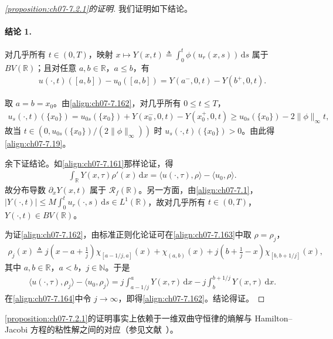 \documentclass[../../main.tex]{subfiles}%
\begin{document}
\begin{proof}[\cref{proposition:ch07-7.2.1}的证明]
我们证明如下结论。

\paragraph{结论 1.}对几乎所有 $t\in(0,T)$，映射 $x\mapsto Y(x,t)\triangleq \int_0^t\phi(u_r(x,s))\,\mathrm{d}s$ 属于 $BV(\mathbb{R})$；且对任意 $a,b\in\mathbb{R}$，$a\leqslant b$，有
\begin{align}
u(\cdot,t)([a,b])-u_0([a,b])=Y(a^-,0,t)-Y(b^+,0,t). \label{align:ch07-7.162}
\end{align}

取 $a=b=x_0$。由\eqref{align:ch07-7.162}，对几乎所有 $0\leqslant t\leqslant T$，
\begin{align*}
u_s(\cdot,t)(\{x_0\})=u_{0s}(\{x_0\})+Y(x_0^-,0,t)-Y(x_0^+,0,t)
\geqslant u_{0s}(\{x_0\})-2\|\phi\|_\infty t,
\end{align*}
故当 $t\in(0,u_{0s}(\{x_0\})/(2\|\phi\|_\infty))$ 时 $u_s(\cdot,t)(\{x_0\})>0$。由此得\eqref{align:ch07-7.19}。

余下证结论。如\eqref{align:ch07-7.161}那样论证，得
\begin{align}
\int_\mathbb{R}Y(x,\tau)\rho'(x)\,\mathrm{d}x=\langle u(\cdot,\tau),\rho\rangle-\langle u_0,\rho\rangle. \label{align:ch07-7.163}
\end{align}
故分布导数 $\partial_xY(x,t)$ 属于 $\mathscr{R}_f(\mathbb{R})$。另一方面，由\eqref{align:ch07-7.1}，$|Y(\cdot,t)|\leqslant M\int_0^t u_r(\cdot,s)\,\mathrm{d}s\in L^1(\mathbb{R})$，故对几乎所有 $t\in(0,T)$，$Y(\cdot,t)\in BV(\mathbb{R})$。

为证\eqref{align:ch07-7.162}，由标准正则化论证可在\eqref{align:ch07-7.163}中取 $\rho=\rho_j$，
\begin{align*}
\rho_j(x)\triangleq j\left(x-a+\frac1j\right)\chi_{[a-1/j,a]}(x)+\chi_{(a,b)}(x)+j\left(b+\frac1j-x\right)\chi_{[b,b+1/j]}(x),
\end{align*}
其中 $a,b\in\mathbb{R}$，$a<b$，$j\in\mathbb{N}$。于是
\begin{align}
\langle u(\cdot,\tau),\rho_j\rangle-\langle u_0,\rho_j\rangle
=j\int_{a-1/j}^a Y(x,\tau)\,\mathrm{d}x-j\int_b^{b+1/j}Y(x,\tau)\,\mathrm{d}x. \label{align:ch07-7.164}
\end{align}
在\eqref{align:ch07-7.164}中令 $j\to\infty$，即得\eqref{align:ch07-7.162}。结论得证。
\end{proof}

\begin{remark}\label{remark:ch07-7.6.1}
\cref{proposition:ch07-7.2.1}的证明事实上依赖于一维双曲守恒律的熵解与 Hamilton--Jacobi 方程的粘性解之间的对应（参见文献~\cite{ref21,ref20}）。
\end{remark}
\end{document}
